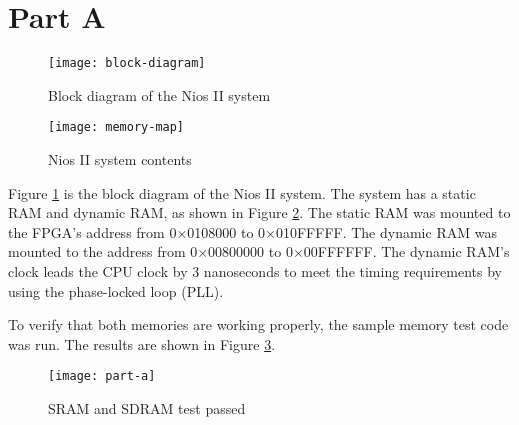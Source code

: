 \newpage
\section{Part A}

\begin{figure}[htbp]
   \centering
   \texttt{[image: block-diagram]}
   \caption{Block diagram of the Nios II system}
   \label{fig:block-diagram}
\end{figure}

\begin{figure}[htbp]
   \centering
   \texttt{[image: memory-map]}
   \caption{Nios II system contents}
   \label{fig:qsys}
\end{figure}

Figure \ref{fig:block-diagram} is the block diagram of the Nios II system. The system has a static RAM and dynamic RAM, as shown in Figure \ref{fig:qsys}. The static RAM was mounted to the FPGA's address from 0×0108000 to 0×010FFFFF. The dynamic RAM was mounted to the address from 0×00800000 to 0×00FFFFFF. The dynamic RAM's clock leads the CPU clock by 3 nanoseconds to meet the timing requirements by using the phase-locked loop (PLL).

To verify that both memories are working properly, the sample memory test code was run. The results are shown in Figure \ref{fig:part-a}.

\begin{figure}[htbp]
   \centering
   \texttt{[image: part-a]}
   \caption{SRAM and SDRAM test passed}
   \label{fig:part-a}
\end{figure}

